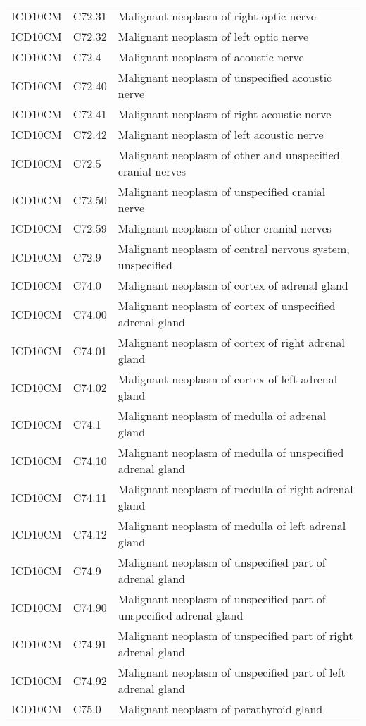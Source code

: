 \begin{longtable}{p{}p{}p{}}
  ICD10CM & C72.31 & Malignant neoplasm of right optic nerve \\ 
  ICD10CM & C72.32 & Malignant neoplasm of left optic nerve \\ 
  ICD10CM & C72.4 & Malignant neoplasm of acoustic nerve \\ 
  ICD10CM & C72.40 & Malignant neoplasm of unspecified acoustic nerve \\ 
  ICD10CM & C72.41 & Malignant neoplasm of right acoustic nerve \\ 
  ICD10CM & C72.42 & Malignant neoplasm of left acoustic nerve \\ 
  ICD10CM & C72.5 & Malignant neoplasm of other and unspecified cranial nerves \\ 
  ICD10CM & C72.50 & Malignant neoplasm of unspecified cranial nerve \\ 
  ICD10CM & C72.59 & Malignant neoplasm of other cranial nerves \\ 
  ICD10CM & C72.9 & Malignant neoplasm of central nervous system, unspecified \\ 
  ICD10CM & C74.0 & Malignant neoplasm of cortex of adrenal gland \\ 
  ICD10CM & C74.00 & Malignant neoplasm of cortex of unspecified adrenal gland \\ 
  ICD10CM & C74.01 & Malignant neoplasm of cortex of right adrenal gland \\ 
  ICD10CM & C74.02 & Malignant neoplasm of cortex of left adrenal gland \\ 
  ICD10CM & C74.1 & Malignant neoplasm of medulla of adrenal gland \\ 
  ICD10CM & C74.10 & Malignant neoplasm of medulla of unspecified adrenal gland \\ 
  ICD10CM & C74.11 & Malignant neoplasm of medulla of right adrenal gland \\ 
  ICD10CM & C74.12 & Malignant neoplasm of medulla of left adrenal gland \\ 
  ICD10CM & C74.9 & Malignant neoplasm of unspecified part of adrenal gland \\ 
  ICD10CM & C74.90 & Malignant neoplasm of unspecified part of unspecified adrenal gland \\ 
  ICD10CM & C74.91 & Malignant neoplasm of unspecified part of right adrenal gland \\ 
  ICD10CM & C74.92 & Malignant neoplasm of unspecified part of left adrenal gland \\ 
  ICD10CM & C75.0 & Malignant neoplasm of parathyroid gland \\ 

\end{longtable}
